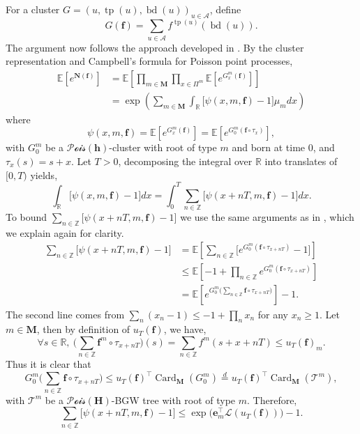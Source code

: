 \documentclass[reqno,final,11pt]{amsart}
\renewcommand{\cite}{\citet}
\theoremstyle{plain}
\theoremstyle{definition}
\theoremstyle{remark}
\newcommand{\R}{\mathds{R}}
\newcommand{\E}[1]{\mathds{E}\left[#1\right]}
\newcommand{\itg}{\displaystyle\int}
\newcommand{\M}{\bm{M}}
\newcommand{\T}{\mathcal{T}}
\newcommand{\A}{\mathcal{A}}
\newcommand{\Z}{\mathds{Z}}
\renewcommand{\L}{\bm{\mathscr{L}}}
\newcommand{\e}{\bm{e}}
\newcommand{\h}{\bm{h}}
\renewcommand{\H}{\bm{H}}
\newcommand{\Pois}{\mathscr{P}\!\mathscr{o}\!\mathscr{i}\!\mathscr{s}}
\newcommand{\trp}{^{\intercal}}
\DeclareMathOperator{\card}{Card}
\DeclareMathOperator{\tp}{tp}
\DeclareMathOperator{\bd}{bd}
\begin{document}
For a cluster $G = (u,\tp(u),\bd(u))_{u\in\A}$, define
\[G(\bm{f}) = \sum_{u\in\A}f^{\tp(u)}(\bd(u)).\] 
The argument now follows the approach developed in \cite{leblanc_exponential_2024}. By the cluster representation and Campbell's formula for Poisson point processes,
\begin{align}
	\E{e^{\bm{N}(\bm{f})}} & = \E{\prod_{m\in\M} \prod_{x\in\Pi^m} \E{e^{G^m_x(\bm{f})}}}\nonumber \\
	& = \exp\left( \sum_{m\in \M} \itg_{\R} \big[\psi(x,m,\bm{f})-1\big] \mu_m dx\right) \label{eq6.8}
\end{align}
where
\begin{equation*}
	\psi(x,m,\bm{f}) = \E{ e^{G^m_x(\bm{f})}} = \E{e^{G^m_0(\bm{f}\circ \tau_x)}},
\end{equation*}
with $G^m_0$ be a $\Pois(\h)$-cluster with root of type $m$ and born at time $0$, and $\tau_x(s) = s+x$. Let $T>0$, decomposing the integral over $\R$ into translates of $[0,T)$ yields,
\begin{equation}\label{eq6.9}
	\itg_{\R} \big[\psi(x,m,\bm{f})-1\big] dx  = \itg_0^T \sum_{n\in\Z} \big[\psi(x+nT,m,\bm{f})-1\big] dx.
\end{equation}
To bound $\sum_{n\in\Z} \big[\psi(x+nT,m,\bm{f})-1\big]$ we use the same arguments as in \cite{leblanc_exponential_2024}, which we explain again for clarity.
\begin{align*}
	\sum_{n\in\Z} \big[ \psi(x+nT,m,\bm{f})-1\big] & = \E{ \sum_{n\in\Z} \big[e^{G^m_0(\bm{f}\circ \tau_{x+nT})}-1\big]} \\
	& \leq \E{ -1+\prod_{n\in\Z} e^{G^m_0(\bm{f}\circ \tau_{x+nT})}  } \\
	& = \E{e^{ G^m_0\big(\sum_{n\in\Z} \bm{f}\circ \tau_{x+nT}\big)}}-1.
\end{align*}
The second line comes from $\sum_n (x_n-1) \leq -1+\prod_n x_n$ for any $x_n\geq 1$. Let $m\in\M$, then by definition of $u_T(\bm{f})$, we have,
	\[\forall s\in\R, \ \Big(\sum_{n\in\Z} \bm{f}^m\circ \tau_{x+nT}\Big)(s) = \sum_{n\in\Z} f^m(s+x+nT) \leq u_T(\bm{f})_m.\]
	Thus it is clear that
\begin{equation*}
	G^m_0\big(\sum_{n\in\Z} \bm{f}\circ \tau_{x+nT}\big) \leq  u_T(\bm{f})\trp \card_{\M}(G^m_0) \overset{d}{=} u_T(\bm{f})\trp \card_{\M}(\T^m),
\end{equation*}
with $\T^m$ be a $\Pois(\H)$-BGW tree with root of type $m$. Therefore,
\begin{equation}\label{eq6.10}
	\sum_{n\in\Z} \big[\psi(x+nT,m,\bm{f})-1\big] \leq \exp\big( \e_{m}\trp \L(u_T(\bm{f}))\big)-1.
\end{equation}
\end{document}
